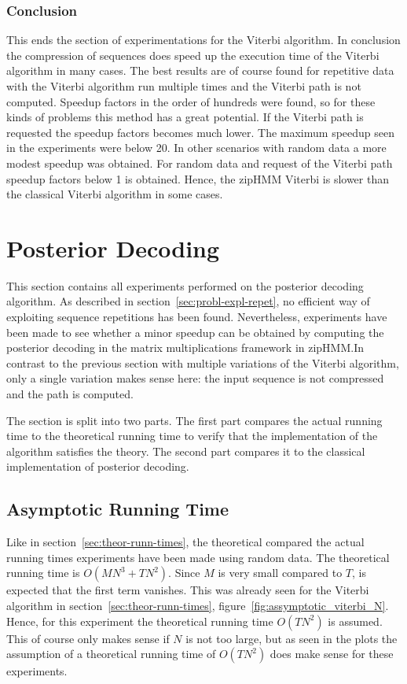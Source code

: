 \subsubsection{Conclusion}

This ends the section of experimentations for the Viterbi algorithm. In
conclusion the compression of sequences does speed up the execution time of the
Viterbi algorithm in many cases. The best results are of course found for
repetitive data with the Viterbi algorithm run multiple times and the Viterbi
path is not computed. Speedup factors in the order of hundreds were found, so
for these kinds of problems this method has a great potential. If the Viterbi
path is requested the speedup factors becomes much lower. The maximum speedup
seen in the experiments were below 20. In other scenarios with random data a
more modest speedup was obtained. For random data and request of the Viterbi
path speedup factors below 1 is obtained. Hence, the zipHMM Viterbi is slower
than the classical Viterbi algorithm in some cases.

\section{Posterior Decoding}

This section contains all experiments performed on the posterior decoding
algorithm. As described in section~\ref{sec:probl-expl-repet}, no efficient way
of exploiting sequence repetitions has been found. Nevertheless, experiments
have been made to see whether a minor speedup can be obtained by computing the
posterior decoding in the matrix multiplications framework in zipHMM.\@ In
contrast to the previous section with multiple variations of the Viterbi
algorithm, only a single variation makes sense here: the input sequence is not
compressed and the path is computed.

The section is split into two parts. The first part compares the actual
running time to the theoretical running time to verify that the implementation
of the algorithm satisfies the theory. The second part compares it to the
classical implementation of posterior decoding.

\subsection{Asymptotic Running Time}
\label{sec:asympt-runn-time}

Like in section~\ref{sec:theor-runn-times}, the theoretical compared the actual
running times experiments have been made using random data. The theoretical
running time is $O(M N^3 + TN^2)$. Since $M$ is very small compared to $T$, is
expected that the first term vanishes. This was already seen for the Viterbi
algorithm in section~\ref{sec:theor-runn-times},
figure~\ref{fig:assymptotic_viterbi_N}. Hence, for this experiment the
theoretical running time $O(TN^2)$ is assumed. This of course only makes sense
if $N$ is not too large, but as seen in the plots the assumption of a
theoretical running time of $O(TN^2)$ does make sense for these experiments.

